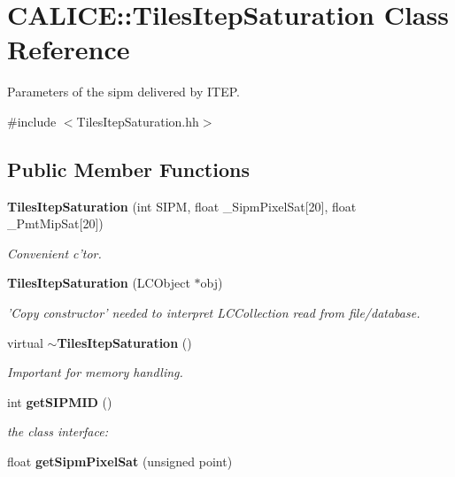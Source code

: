\section{CALICE::TilesItepSaturation Class Reference}
\label{classCALICE_1_1TilesItepSaturation}


Parameters of the sipm delivered by ITEP.  


{\ttfamily \#include $<$TilesItepSaturation.hh$>$}\subsection*{Public Member Functions}
\begin{DoxyCompactItemize}
\item 
{\bf TilesItepSaturation} (int SIPM, float \_\-SipmPixelSat[20], float \_\-PmtMipSat[20])\label{classCALICE_1_1TilesItepSaturation_a137e2d51af34a1e2da83760a187b5190}

\begin{DoxyCompactList}\small\item\em Convenient c'tor. \item\end{DoxyCompactList}\item 
{\bf TilesItepSaturation} (LCObject $\ast$obj)\label{classCALICE_1_1TilesItepSaturation_a0dc9854db9d9e2a0bcf771004db6497b}

\begin{DoxyCompactList}\small\item\em 'Copy constructor' needed to interpret LCCollection read from file/database. \item\end{DoxyCompactList}\item 
virtual {\bf $\sim$TilesItepSaturation} ()\label{classCALICE_1_1TilesItepSaturation_afe66e11277de87e0f32a18718d936537}

\begin{DoxyCompactList}\small\item\em Important for memory handling. \item\end{DoxyCompactList}\item 
int {\bf getSIPMID} ()\label{classCALICE_1_1TilesItepSaturation_a652ac3e86905397910764be8679fc1c0}

\begin{DoxyCompactList}\small\item\em the class interface: \item\end{DoxyCompactList}\item 
float {\bfseries getSipmPixelSat} (unsigned point)\label{classCALICE_1_1TilesItepSaturation_a092ef805416c5a4fa2c42d6e05755365}


\end{DoxyCompactItemize}
